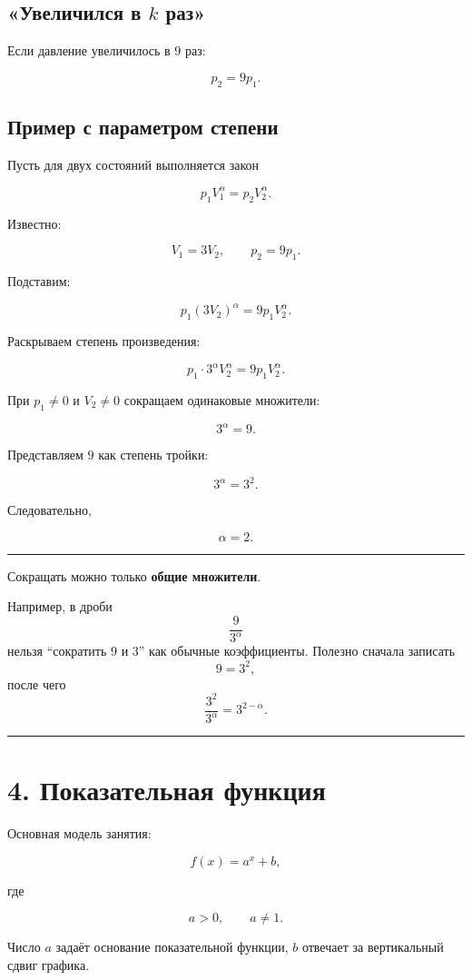 \documentclass[a4paper,12pt]{article}
\newcommand{\important}[1]{\textbf{\color{darkaccent}#1}}
\newcommand{\keyidea}[1]{%
    \par\medskip
    {\color{accent}\rule{\linewidth}{0.6pt}}\par
    \smallskip
    #1
    \smallskip
    {\color{accent}\rule{\linewidth}{0.6pt}}\par
    \medskip
}
\begin{document}
\subsection{«Увеличился в \(k\) раз»}

Если давление увеличилось в \(9\) раз:

\[
p_2=9p_1.
\]

\subsection{Пример с параметром степени}

Пусть для двух состояний выполняется закон

\[
p_1V_1^\alpha=p_2V_2^\alpha.
\]

Известно:

\[
V_1=3V_2,
\qquad
p_2=9p_1.
\]

Подставим:

\[
p_1(3V_2)^\alpha
=
9p_1V_2^\alpha.
\]

Раскрываем степень произведения:

\[
p_1\cdot3^\alpha V_2^\alpha
=
9p_1V_2^\alpha.
\]

При \(p_1\ne0\) и \(V_2\ne0\) сокращаем одинаковые множители:

\[
3^\alpha=9.
\]

Представляем \(9\) как степень тройки:

\[
3^\alpha=3^2.
\]

Следовательно,

\[
\alpha=2.
\]

\keyidea{
Сокращать можно только \important{общие множители}.

Например, в дроби
\[
\frac{9}{3^\alpha}
\]
нельзя ``сократить \(9\) и \(3\)'' как обычные коэффициенты. Полезно сначала записать
\[
9=3^2,
\]
после чего
\[
\frac{3^2}{3^\alpha}=3^{2-\alpha}.
\]
}

\section{4. Показательная функция}

Основная модель занятия:

\[
f(x)=a^x+b,
\]

где

\[
a>0,
\qquad
a\ne1.
\]

Число \(a\) задаёт основание показательной функции, \(b\) отвечает за вертикальный сдвиг графика.
\end{document}
